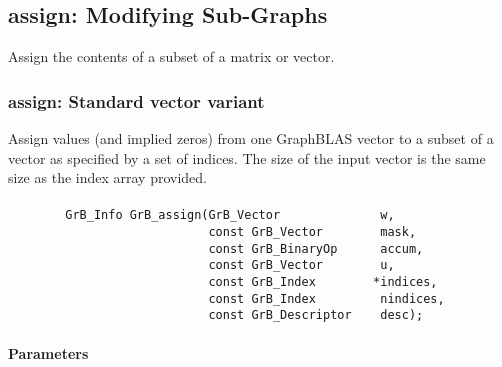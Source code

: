 \subsection{{\sf assign}: Modifying Sub-Graphs}
\label{Sec:assign}

Assign the contents of a subset of a matrix or vector.

\subsubsection{{\sf assign}: Standard vector variant}

Assign values (and implied zeros) from one GraphBLAS vector to a subset of a 
vector as specified by a set of indices. The size of the input vector is the
same size as the index array provided.

\paragraph{\syntax}

\begin{verbatim}
        GrB_Info GrB_assign(GrB_Vector              w,
                            const GrB_Vector        mask,
                            const GrB_BinaryOp      accum,
                            const GrB_Vector        u,
                            const GrB_Index        *indices,
                            const GrB_Index         nindices,
                            const GrB_Descriptor    desc);
\end{verbatim}

\paragraph{Parameters}

